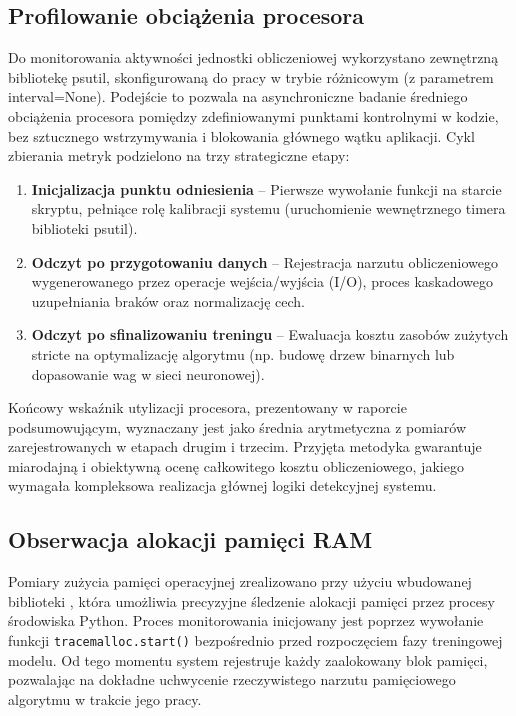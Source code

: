 \documentclass[12pt,twoside]{article}
\begin{document}
\subsection{Profilowanie obciążenia procesora}
Do monitorowania aktywności jednostki obliczeniowej wykorzystano zewnętrzną bibliotekę psutil, skonfigurowaną do pracy w trybie różnicowym (z parametrem interval=None). Podejście to pozwala na asynchroniczne badanie średniego obciążenia procesora pomiędzy zdefiniowanymi punktami kontrolnymi w kodzie, bez sztucznego wstrzymywania i blokowania głównego wątku aplikacji. Cykl zbierania metryk podzielono na trzy strategiczne etapy:
\begin{enumerate}[label=\alph*), leftmargin=1.25cm]
\item \textbf{Inicjalizacja punktu odniesienia} -- Pierwsze wywołanie funkcji na starcie skryptu, pełniące rolę kalibracji systemu (uruchomienie wewnętrznego timera biblioteki psutil).
\item \textbf{Odczyt po przygotowaniu danych} -- Rejestracja narzutu obliczeniowego wygenerowanego przez operacje wejścia/wyjścia (I/O), proces kaskadowego uzupełniania braków oraz normalizację cech.
\item \textbf{Odczyt po sfinalizowaniu treningu} -- Ewaluacja kosztu zasobów zużytych stricte na optymalizację algorytmu (np. budowę drzew binarnych lub dopasowanie wag w sieci neuronowej).
\end{enumerate}
Końcowy wskaźnik utylizacji procesora, prezentowany w raporcie podsumowującym, wyznaczany jest jako średnia arytmetyczna z pomiarów zarejestrowanych w etapach drugim i trzecim. Przyjęta metodyka gwarantuje miarodajną i obiektywną ocenę całkowitego kosztu obliczeniowego, jakiego wymagała kompleksowa realizacja głównej logiki detekcyjnej systemu.

\subsection{Obserwacja alokacji pamięci RAM}
Pomiary zużycia pamięci operacyjnej zrealizowano przy użyciu wbudowanej biblioteki , która umożliwia precyzyjne śledzenie alokacji pamięci przez procesy środowiska Python. Proces monitorowania inicjowany jest poprzez wywołanie funkcji \texttt{tracemalloc.start()} bezpośrednio przed rozpoczęciem fazy treningowej modelu. Od tego momentu system rejestruje każdy zaalokowany blok pamięci, pozwalając na dokładne uchwycenie rzeczywistego narzutu pamięciowego algorytmu w trakcie jego pracy.
\end{document}
